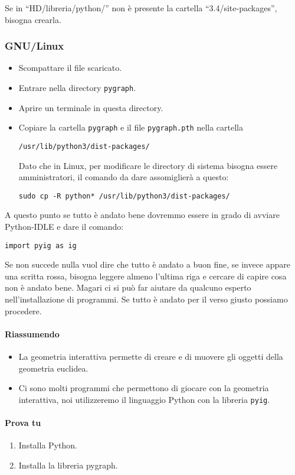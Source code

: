 Se in ``HD/libreria/python/'' non è presente la cartella 
``3.4/site-packages'', bisogna crearla.

\subsubsection*{GNU/Linux}

\begin{itemize} [noitemsep]
\item {} Scompattare il file scaricato.
\item {} Entrare nella directory \texttt{pygraph}.
\item {} Aprire un terminale in questa directory.
\item {} Copiare la cartella \texttt{pygraph} e il file \texttt{pygraph.pth}
  nella cartella
  
  \texttt{/usr/lib/python3/dist-packages/}
  
  Dato che in Linux, per modificare le directory di sistema bisogna essere 
  amministratori, il comando da dare assomiglierà a questo:
  
  \texttt{sudo cp -R python* /usr/lib/python3/dist-packages/}
\end{itemize}

A questo punto se tutto è andato bene dovremmo essere in grado di avviare 
Python-IDLE e dare il comando:

\texttt{import pyig as ig}

Se non succede nulla vuol dire che tutto è andato a buon fine, 
se invece appare una scritta rossa, bisogna leggere almeno l'ultima riga
e cercare di capire cosa non è andato bene. Magari ci si può far aiutare
da qualcuno esperto nell'installazione di programmi.
Se tutto è andato per il verso giusto possiamo procedere.

\paragraph{Riassumendo}
\begin{itemize} [nosep]
\item La geometria interattiva permette di creare e di muovere gli oggetti 
della geometria euclidea.
\item Ci sono molti programmi che permettono di giocare con la geometria
interattiva, noi utilizzeremo il linguaggio Python con la libreria 
\texttt{pyig}.
\end{itemize}

\paragraph{Prova tu}
\begin{enumerate} [nosep]
\item Installa Python.
\item Installa la libreria pygraph.
\end{enumerate}


